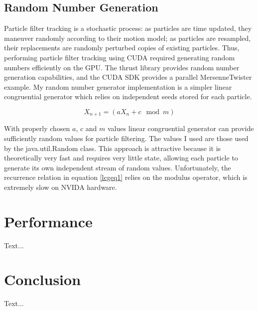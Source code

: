 \documentclass{article}
\begin{document}
\subsection{Random Number Generation}
Particle filter tracking is a stochastic process: as particles are time updated, they maneuver randomly according to their motion model; as particles are resampled, their replacements are randomly perturbed copies of existing particles. Thus, performing particle filter tracking using CUDA required generating random numbers efficiently on the GPU. The thrust library provides random number generation capabilities, and the CUDA SDK provides a parallel MersenneTwister example. My random number generator implementation is a simpler linear congruential generator which relies on independent seeds stored for each particle.

\begin{equation}\label{lcgeq1}
X_{n+1}=(aX_{n}+c \mod m)
\end{equation}

With properly chosen \(a\), \(c\) and \(m\) values linear congruential generator can provide sufficiently random values for particle filtering. The values I used are those used by the java.util.Random class. This approach is attractive because it is theoretically very fast and requires very little state, allowing each particle to generate its own independent stream of random values. Unfortunately, the recurrence relation in equation \ref{lcgeq1} relies on the modulus operator, which is extremely slow on NVIDA hardware.\cite{oprc}

\section{Performance}
Text...

\section{Conclusion}
Text...
\end{document}
